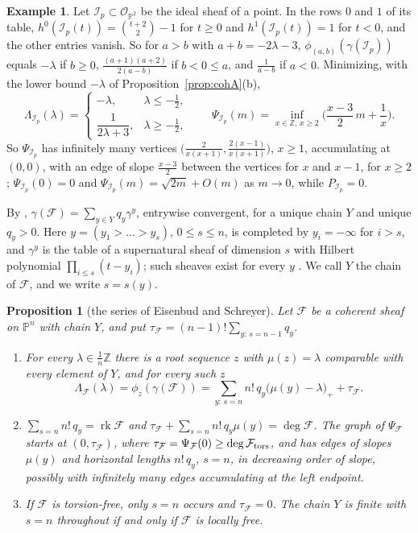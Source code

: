 \documentclass[11pt]{amsart}
\newtheorem{proposition}[theorem]{Proposition}
\theoremstyle{definition}
\newtheorem{example}[theorem]{Example}
\theoremstyle{remark}
\newcommand{\PP}{\mathbb{P}}
\newcommand{\ZZ}{\mathbb{Z}}
\newcommand{\OO}{\mathcal{O}}
\newcommand{\cF}{\mathcal{F}}
\newcommand{\cI}{\mathcal{I}}
\DeclareMathOperator{\rk}{rk}
\begin{document}
\begin{example}\label{ex:Ip}
Let $\cI_p\subset\OO_{\PP^2}$ be the ideal sheaf of a point. In the rows $0$ and $1$ of its table, $h^0(\cI_p(t))=\binom{t+2}2-1$ for $t\ge0$ and $h^1(\cI_p(t))=1$ for $t<0$, and the other entries vanish. So for $a>b$ with $a+b=-2\lambda-3$, $\phi_{(a,b)}(\gamma(\cI_p))$ equals $-\lambda$ if $b\ge0$, $\frac{(a+1)(a+2)}{2(a-b)}$ if $b<0\le a$, and $\frac1{a-b}$ if $a<0$. Minimizing, with the lower bound $-\lambda$ of Proposition~\ref{prop:cohA}(b),
\[
\Lambda_{\cI_p}(\lambda)=\begin{cases}-\lambda, & \lambda\le-\frac12,\\[0.5ex] \dfrac1{2\lambda+3}, & \lambda\ge-\frac12,\end{cases}\qquad \Psi_{\cI_p}(m)=\inf_{x\in\ZZ,\,x\ge2}\Big(\frac{x-3}2\,m+\frac1x\Big).
\]
So $\Psi_{\cI_p}$ has infinitely many vertices $\big(\frac2{x(x+1)},\frac{2(x-1)}{x(x+1)}\big)$, $x\ge1$, accumulating at $(0,0)$, with an edge of slope $\frac{x-3}2$ between the vertices for $x$ and $x-1$, for $x\ge2$; $\Psi_{\cI_p}(0)=0$ and $\Psi_{\cI_p}(m)=\sqrt{2m}+O(m)$ as $m\to0$, while $P_{\cI_p}=0$.
\end{example}

By \cite[Thm.~0.2]{ES10}, $\gamma(\cF)=\sum_{y\in Y}q_y\gamma^y$, entrywise convergent, for a unique chain $Y$ and unique $q_y>0$. Here $y=(y_1>\dots>y_s)$, $0\le s\le n$, is completed by $y_i=-\infty$ for $i>s$, and $\gamma^y$ is the table of a supernatural sheaf of dimension $s$ with Hilbert polynomial $\prod_{i\le s}(t-y_i)$; such sheaves exist for every $y$ \cite{ES10}. We call $Y$ the chain of $\cF$, and we write $s=s(y)$.

\begin{proposition}[the series of Eisenbud and Schreyer]\label{prop:cohseries}
Let $\cF$ be a coherent sheaf on $\PP^n$ with chain $Y$, and put $\tau_\cF=(n-1)!\sum_{y:\,s=n-1}q_y$.
\begin{enumerate}[label=\textup{(\alph*)}]
\item For every $\lambda\in\frac1n\ZZ$ there is a root sequence $z$ with $\mu(z)=\lambda$ comparable with every element of $Y$, and for every such $z$
\[
\Lambda_\cF(\lambda)=\phi_z(\gamma(\cF))=\sum_{y:\,s=n}n!\,q_y\big(\mu(y)-\lambda\big)_++\tau_\cF .
\]
\item $\sum_{s=n}n!\,q_y=\rk\cF$ and $\tau_\cF+\sum_{s=n}n!\,q_y\mu(y)=\deg\cF$. The graph of $\Psi_\cF$ starts at $(0,\tau_\cF)$, where $\tau_\cF=\Psi_\cF(0)\ge\deg\cF_{\rm tors}$, and has edges of slopes $\mu(y)$ and horizontal lengths $n!\,q_y$, $s=n$, in decreasing order of slope, possibly with infinitely many edges accumulating at the left endpoint.
\item If $\cF$ is torsion-free, only $s=n$ occurs and $\tau_\cF=0$. The chain $Y$ is finite with $s=n$ throughout if and only if $\cF$ is locally free.
\end{enumerate}
\end{proposition}
\end{document}
